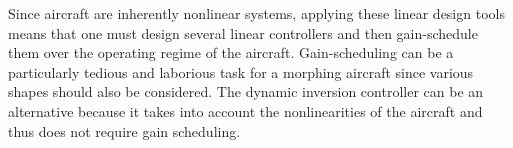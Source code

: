 \documentclass[a4paper, 12pt]{report}
\begin{document}
	Since aircraft are inherently nonlinear systems, applying these linear design tools means that one must design several linear controllers and then gain-schedule them over the operating regime of the aircraft.
	Gain-scheduling can be a particularly tedious and laborious task for a morphing aircraft since various shapes should also be considered.
	The dynamic inversion controller can be an alternative because it takes into account the nonlinearities of the aircraft and thus does not require gain scheduling.
	
	\printbibliography
	
\end{document}
